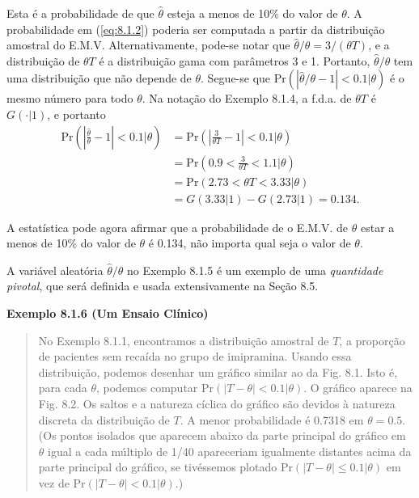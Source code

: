 Esta é a probabilidade de que $\hat{\theta}$ esteja a menos de 10\% do valor de $\theta$. A probabilidade em (\ref{eq:8.1.2}) poderia ser computada a partir da distribuição amostral do E.M.V. Alternativamente, pode-se notar que $\hat{\theta}/\theta = 3/(\theta T)$, e a distribuição de $\theta T$ é a distribuição gama com parâmetros 3 e 1. Portanto, $\hat{\theta}/\theta$ tem uma distribuição que não depende de $\theta$. Segue-se que $\text{Pr}(|\hat{\theta}/\theta - 1| < 0.1|\theta)$ é o mesmo número para todo $\theta$. Na notação do Exemplo 8.1.4, a f.d.a. de $\theta T$ é $G(\cdot|1)$, e portanto
\begin{align*}
    \text{Pr}\left(\left|\frac{\hat{\theta}}{\theta} - 1\right| < 0.1 \bigg| \theta\right) &= \text{Pr}\left(\left|\frac{3}{\theta T} - 1\right| < 0.1 \bigg| \theta\right) \\
    &= \text{Pr}\left(0.9 < \frac{3}{\theta T} < 1.1 \bigg| \theta\right) \\
    &= \text{Pr}(2.73 < \theta T < 3.33 | \theta) \\
    &= G(3.33|1) - G(2.73|1) = 0.134.
\end{align*}

A estatística pode agora afirmar que a probabilidade de o E.M.V. de $\theta$ estar a menos de 10\% do valor de $\theta$ é 0.134, não importa qual seja o valor de $\theta$.

\vspace{1em}
A variável aleatória $\hat{\theta}/\theta$ no Exemplo 8.1.5 é um exemplo de uma \textit{quantidade pivotal}, que será definida e usada extensivamente na Seção 8.5.

\vspace{1em}
\noindent\textbf{Exemplo 8.1.6 (Um Ensaio Clínico)}
\begin{quote}
    No Exemplo 8.1.1, encontramos a distribuição amostral de $T$, a proporção de pacientes sem recaída no grupo de imipramina. Usando essa distribuição, podemos desenhar um gráfico similar ao da Fig. 8.1. Isto é, para cada $\theta$, podemos computar $\text{Pr}(|T-\theta|<0.1|\theta)$. O gráfico aparece na Fig. 8.2. Os saltos e a natureza cíclica do gráfico são devidos à natureza discreta da distribuição de $T$. A menor probabilidade é 0.7318 em $\theta = 0.5$. (Os pontos isolados que aparecem abaixo da parte principal do gráfico em $\theta$ igual a cada múltiplo de 1/40 apareceriam igualmente distantes acima da parte principal do gráfico, se tivéssemos plotado $\text{Pr}(|T-\theta|\le 0.1|\theta)$ em vez de $\text{Pr}(|T-\theta|<0.1|\theta)$.)
\end{quote}
\vspace{1em}

